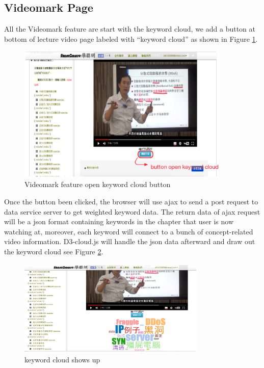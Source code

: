 \subsection{Videomark Page}
All the Videomark feature are start with the keyword cloud, we add a button at bottom of lecture video page labeled with ``keyword cloud'' as shown in Figure \ref{fig:cloudbutton}.

\begin{figure}[H]
    \centering
    \includegraphics[width = 0.9\textwidth]{fig/cloudbutton.eps}
    \caption{Videomark feature open keyword cloud button}
    \label{fig:cloudbutton}
\end{figure}

Once the button been clicked, the browser will use ajax to send a post request to data service server to get weighted keyword data.
The return data of ajax request will be a json format containing keywords in the chapter that user is now watching at, moreover, each keyword will connect to a bunch of concept-related video information.
D3-cloud.js will handle the json data afterward and draw out the keyword cloud see Figure \ref{fig:cloudopened}.

\begin{figure}[H]
    \centering
    \includegraphics[width = 0.8\textwidth]{fig/cloudopened.eps}
    \caption{keyword cloud shows up}
    \label{fig:cloudopened}
\end{figure}

